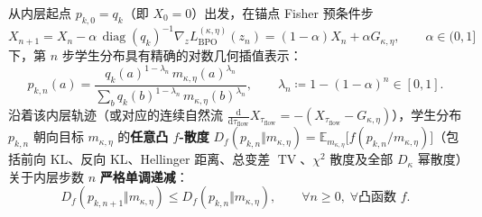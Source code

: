 \documentclass[lang=cn,scheme=chinese,openany]{../book/elegantbook}
\newcommand{\E}{\mathbb E}
\newcommand{\TV}{\operatorname{TV}}
\begin{document}
\begin{theorem}
\label{thm:power-bpo-inner-all-f}
从内层起点 $p_{k,0}=q_k$（即 $X_0=0$）出发，在锚点 Fisher 预条件步
\begin{equation}
 X_{n+1} = X_n - \alpha\,\operatorname{diag}(q_k)^{-1}\nabla_z L_{\mathrm{BPO}}^{(\kappa,\eta)}(z_n)
 = (1-\alpha)X_n + \alpha G_{\kappa,\eta},
 \qquad \alpha\in(0,1]
 \label{eq:power-bpo-anchor-fisher-step}
\end{equation}
下，第 $n$ 步学生分布具有精确的对数几何插值表示：
\begin{equation}
 p_{k,n}(a) = \frac{q_k(a)^{1-\lambda_n}\,m_{\kappa,\eta}(a)^{\lambda_n}}{\sum_{b} q_k(b)^{1-\lambda_n}\,m_{\kappa,\eta}(b)^{\lambda_n}},
 \qquad \lambda_n \coloneqq 1-(1-\alpha)^n \in [0,1].
 \label{eq:power-bpo-geodesic-iterate}
\end{equation}
沿着该内层轨迹（或对应的连续自然流 $\frac{\mathrm d}{\mathrm d\tau_{\mathrm{flow}}}X_{\tau_{\mathrm{flow}}}=-(X_{\tau_{\mathrm{flow}}}-G_{\kappa,\eta})$），学生分布 $p_{k,n}$ 朝向目标 $m_{\kappa,\eta}$ 的\textbf{任意凸 $f$-散度} $D_f(p_{k,n}\Vert m_{\kappa,\eta})=\E_{m_{\kappa,\eta}}\bigl[f(p_{k,n}/m_{\kappa,\eta})\bigr]$（包括前向 KL、反向 KL、Hellinger 距离、总变差 $\TV$、$\chi^2$ 散度及全部 $D_\kappa$ 幂散度）关于内层步数 $n$ \textbf{严格单调递减}：
\begin{equation}
 D_f(p_{k,n+1}\Vert m_{\kappa,\eta}) \le D_f(p_{k,n}\Vert m_{\kappa,\eta}),
 \qquad \forall n\ge 0,\;\forall \text{凸函数 } f.
 \label{eq:all-f-divergence-monotone}
\end{equation}
\end{theorem}
\end{document}
